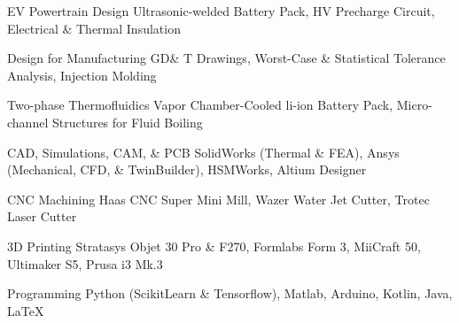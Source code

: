 


\begin{cvskills}





\cvskill
{EV Powertrain Design}
{Ultrasonic-welded Battery Pack, HV Precharge Circuit, Electrical \& Thermal Insulation}

\cvskill
{Design for Manufacturing}
{GD\& T Drawings, Worst-Case \& Statistical Tolerance Analysis, Injection Molding}

\cvskill
{Two-phase Thermofluidics}
{Vapor Chamber-Cooled li-ion Battery Pack, Micro-channel Structures for Fluid Boiling}

\cvskill
{CAD, Simulations, CAM, \& PCB} %
{SolidWorks (Thermal \& FEA), Ansys (Mechanical, CFD, \& TwinBuilder), HSMWorks,  Altium Designer} %

\cvskill
{CNC Machining}
{Haas CNC Super Mini Mill, Wazer Water Jet Cutter, Trotec Laser Cutter}

\cvskill
{3D Printing} %
{Stratasys Objet 30 Pro \& F270, Formlabs Form 3, MiiCraft 50, Ultimaker S5, Prusa i3 Mk.3} %

\cvskill
{Programming} %
{Python (ScikitLearn \& Tensorflow), Matlab, Arduino, Kotlin, Java, LaTeX} %



\end{cvskills}